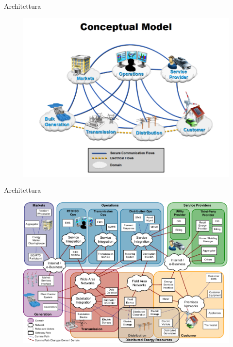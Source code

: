 \begin{frame}[fragile]{Architettura}
	\begin{figure}[h] 
		\includegraphics[scale=0.6]{imgs/sg.png}
	\end{figure}
\end{frame}

\begin{frame}[fragile]{Architettura}
	\vspace{-10pt}
	\begin{figure}[h] 
		\includegraphics[scale=0.45]{imgs/arch.png}
	\end{figure}
\end{frame}


